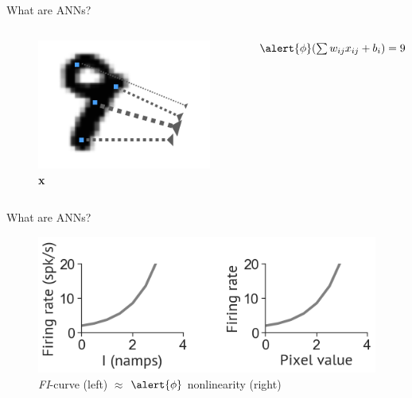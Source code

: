 \documentclass[10pt]{beamer}
\begin{document}
\begin{frame}[fragile]{What are ANNs?}
\begin{columns}
\begin{figure}
    \centering
    \includegraphics[scale=0.5]{images/nine_wx.png} 
    \caption{\textbf{x}}
\end{figure}
\centering
 $\alert{\phi}(\sum w_{ij} x_{ij} + b_i) = 9$
\end{columns}
\end{frame}

\begin{frame}[fragile]{What are ANNs?}
\begin{figure}
    \centering
    \includegraphics[scale=0.4]{images/phi.png}
    \caption{\textit{FI}-curve (left) $\approx$ $\alert{\phi}$ nonlinearity (right)}
\end{figure}
\end{frame}
\end{document}
